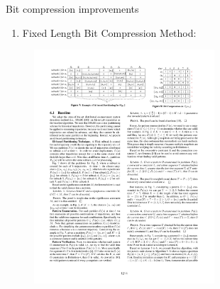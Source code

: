 \documentclass{beamer}
\begin{document}
\begin{frame}{Bit compression improvements}
    \begin{enumerate}[2]
        \item Fixed Length Bit Compression Method:
    \end{enumerate}
    \centering 
    \begin{figure}
        \includegraphics[trim=13.5cm 21cm 2cm 2cm, clip, width=0.6\textwidth]{figures/Chen_p1214}
    \end{figure}
\end{frame}
\end{document}
